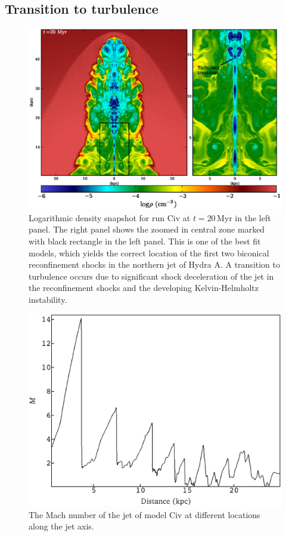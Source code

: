 \subsection{Transition to turbulence}
\begin{figure}
\centering
\includegraphics[width=\textwidth]{cbm.eps}
\caption{Logarithmic density snapshot for run Civ at $t=20\,\mathrm{Myr}$ in the left panel. The right panel shows the zoomed in central zone marked with black rectangle in the left panel. This is one of the best fit models, which yields the correct location of the first two biconical reconfinement shocks in the northern jet of Hydra A. A transition to turbulence occurs due to significant shock deceleration of the jet in the reconfinement shocks and the developing Kelvin-Helmholtz instability. }
\label{t_trans}
\end{figure}
 
 \begin{figure}
\centering
\includegraphics[width=\linewidth]{cml.eps}
\caption{The Mach number of the jet of model Civ at different locations along the jet axis.}
\label{mach}
\end{figure}
 

